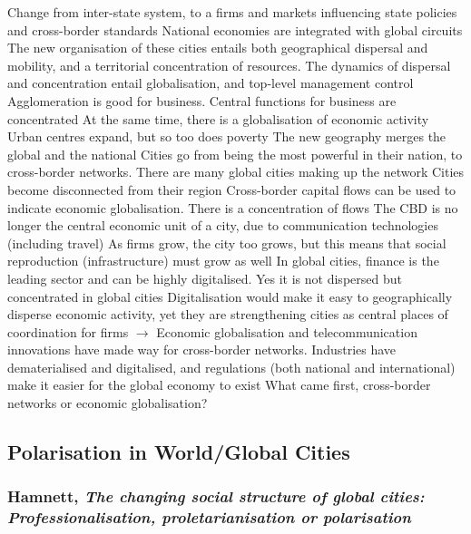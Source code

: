 \documentclass{article}
\begin{document}
\begin{outline}
	\1 Change from inter-state system, to a firms and markets influencing state policies and cross-border standards
	\1 National economies are integrated with global circuits
	\1 The new organisation of these cities entails both geographical dispersal and mobility, and a territorial concentration of resources. The dynamics of dispersal and concentration entail globalisation, and top-level management control
		\2 Agglomeration is good for business. Central functions for business are concentrated
		\2 At the same time, there is a globalisation of economic activity
	\1 Urban centres expand, but so too does poverty
	\1 The new geography merges the global and the national
		\2 Cities go from being the most powerful in their nation, to cross-border networks. There are many global cities making up the network
		\2 Cities become disconnected from their region
	\1 Cross-border capital flows can be used to indicate economic globalisation. There is a concentration of flows
	\1 The CBD is no longer the central economic unit of a city, due to communication technologies (including travel)
	\1 As firms grow, the city too grows, but this means that social reproduction (infrastructure) must grow as well
	\1 In global cities, finance is the leading sector and can be highly digitalised. Yes it is not dispersed but concentrated in global cities
		\2 Digitalisation would make it easy to geographically disperse economic activity, yet they are strengthening cities as central places of coordination for firms
	\1 $\rightarrow$ Economic globalisation and telecommunication innovations have made way for cross-border networks. Industries have dematerialised and digitalised, and regulations (both national and international) make it easier for the global economy to exist
		\2 What came first, cross-border networks or economic globalisation?
\end{outline}

\subsection{Polarisation in World/Global Cities}

\subsubsection{Hamnett, \textit{The changing social structure of global cities: Professionalisation, proletarianisation or polarisation}}
\end{document}
